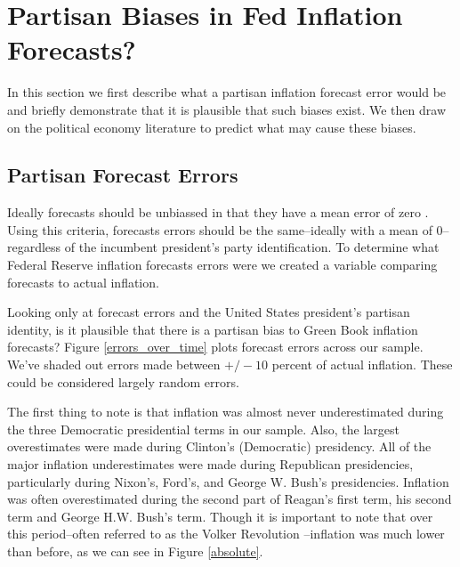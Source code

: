 \documentclass[a4paper]{article}\usepackage{graphicx, color}
\begin{document}

\section{Partisan Biases in Fed Inflation Forecasts?}

In this section we first describe what a partisan inflation forecast error would be and briefly demonstrate that it is plausible that such biases exist. We then draw on the political economy literature to predict what may cause these biases.

\subsection{Partisan Forecast Errors}

Ideally forecasts should be unbiassed in that they have a mean error of zero \citep[5]{Bruck2006}. Using this criteria, forecasts errors should be the same--ideally with a mean of 0--regardless of the incumbent president's party identification. To determine what Federal Reserve inflation forecasts errors were we created a variable comparing forecasts to actual inflation. 

Looking only at forecast errors and the United States president's partisan identity, is it plausible that there is a partisan bias to Green Book inflation forecasts? Figure \ref{errors_over_time} plots forecast errors across our sample. We've shaded out errors made between $+/- 10$ percent of actual inflation. These could be considered largely random errors. 

The first thing to note is that inflation was almost never underestimated during the three Democratic presidential terms in our sample. Also, the largest overestimates were made during Clinton's (Democratic) presidency. All of the major inflation underestimates were made during Republican presidencies, particularly during Nixon's, Ford's, and George W. Bush's presidencies. Inflation was often overestimated during the second part of Reagan's first term, his second term and George H.W. Bush's term. Though it is important to note that over this period--often referred to as the Volker Revolution \citep[see][]{Bartels1985}--inflation was much lower than before, as we can see in Figure \ref{absolute}.
\end{document}
